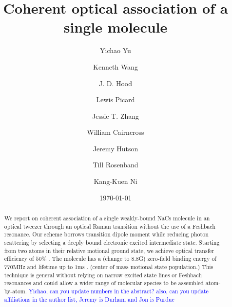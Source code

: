 \documentclass[aps,prl,twocolumn,groupedaddress]{revtex4-1}
\newcommand{\todo}[1]{}
\begin{document}
\title{Coherent optical association of a single molecule}
\author{Yichao Yu}
\author{Kenneth Wang}
\author{J. D. Hood}
\author{Lewis Picard}
\author{Jessie T. Zhang}
\author{William Cairncross}
\author{Jeremy Hutson}
\author{Till Rosenband}
\author{Kang-Kuen Ni}

\date{\today}

\begin{abstract}
  We report on coherent association of a single weakly-bound NaCs molecule in an optical tweezer
  through an optical Raman transition without the use of a Feshbach resonance. Our scheme borrows transition dipole moment while reducing photon scattering by selecting a deeply bound electronic excited intermediate state.
  Starting from two atoms in their relative motional ground state,
  we achieve optical transfer efficiency of $50 \%$ \todo{number}.
  The molecule has a (change to 8.8G) zero-field binding energy of $770 \mathrm{MHz}$ \todo{number}
  and lifetime up to $1 \mathrm{ms}$ \todo{number}. (center of mass motional state population.)
  This technique is general without relying on narrow excited state lines or Feshbach resonances and could allow a wider range of molecular species to be assembled atom-by-atom. \textcolor{blue}{Yichao, can you update numbers in the abstract? also, can you update affiliations in the author list, Jeremy is Durham and Jon is Purdue}
\end{abstract}


\maketitle



\end{document}
